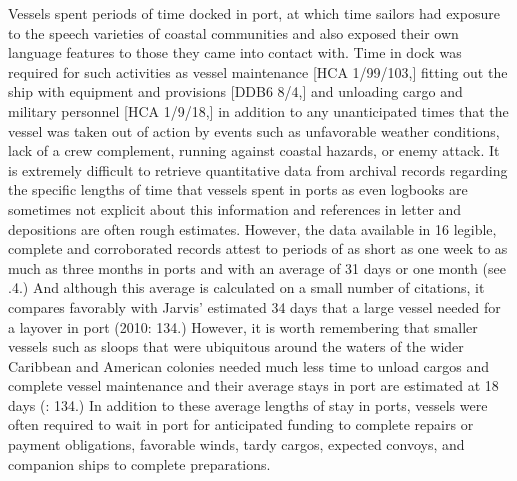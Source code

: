 Vessels spent periods of time docked in port, at which time sailors had exposure to the speech varieties of coastal communities and also exposed their own language features to those they came into contact with. Time in dock was required for such activities as vessel maintenance [HCA 1/99/103,] fitting out the ship with equipment and provisions [DDB6 8/4,] and unloading cargo and military personnel [HCA 1/9/18,] in addition to any unanticipated times that the vessel was taken out of action by events such as unfavorable weather conditions, lack of a crew complement, running against coastal hazards, or enemy attack. It is extremely difficult to retrieve quantitative data from archival records regarding the specific lengths of time that vessels spent in ports as even logbooks are sometimes not explicit about this information and references in letter and depositions are often rough estimates. However, the data available in 16 legible, complete and corroborated records attest to periods of as short as one week to as much as three months in ports and with an average of 31 days or one month (see .4.) And although this average is calculated on a small number of citations, it compares favorably with Jarvis’ estimated 34 days that a large vessel needed for a layover in port (2010: 134.) However, it is worth remembering that smaller vessels such as sloops that were ubiquitous around the waters of the wider Caribbean and American colonies needed much less time to unload cargos and complete vessel maintenance and their average stays in port are estimated at 18 days (\citealt{Jarvis2010}: 134.) In addition to these average lengths of stay in ports, vessels were often required to wait in port for anticipated funding to complete repairs or payment obligations, favorable winds, tardy cargos, expected convoys, and companion ships to complete preparations. 

